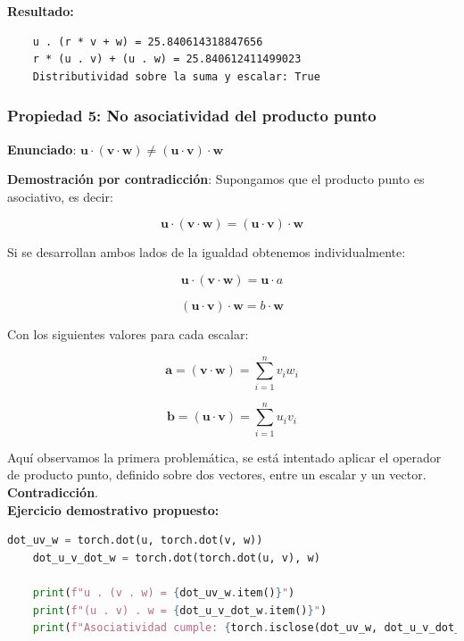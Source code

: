 \documentclass[12 pt]{article}
\begin{document}
\textbf{Resultado:}
\begin{lstlisting}
    u . (r * v + w) = 25.840614318847656
    r * (u . v) + (u . w) = 25.840612411499023
    Distributividad sobre la suma y escalar: True
\end{lstlisting}


\subsubsection*{Propiedad 5: No asociatividad del producto punto}

\begin{center}
\textbf{Enunciado}: \(\mathbf{u} \cdot (\mathbf{v} \cdot \mathbf{w}) \neq (\mathbf{u} \cdot \mathbf{v}) \cdot \mathbf{w}\)\\
\end{center}

\textbf{Demostración por contradicción}: Supongamos que el producto punto es asociativo, es decir:

\[
\mathbf{u} \cdot (\mathbf{v} \cdot \mathbf{w}) = (\mathbf{u} \cdot \mathbf{v}) \cdot \mathbf{w}
\]

Si se desarrollan ambos lados de la igualdad obtenemos individualmente:

\[
\mathbf{u} \cdot (\mathbf{v} \cdot \mathbf{w}) = \mathbf{u} \cdot a
\]

\[
(\mathbf{u} \cdot \mathbf{v}) \cdot \mathbf{w} = b \cdot \mathbf{w}
\]

Con los siguientes valores para cada escalar:

\[
\mathbf{a} = (\mathbf{v} \cdot \mathbf{w}) = \sum_{i=1}^{n} v_i w_i
\]

\[
\mathbf{b} = (\mathbf{u} \cdot \mathbf{v}) = \sum_{i=1}^{n} u_i v_i
\]

Aquí observamos la primera problemática, se está intentado aplicar el operador de producto punto, definido sobre dos vectores, entre un escalar y un vector. \textbf{Contradicción}.\\

\textbf{Ejercicio demostrativo propuesto:}
\begin{lstlisting}[language=Python]
    dot_uv_w = torch.dot(u, torch.dot(v, w))
    dot_u_v_dot_w = torch.dot(torch.dot(u, v), w)
    
    print(f"u . (v . w) = {dot_uv_w.item()}")
    print(f"(u . v) . w = {dot_u_v_dot_w.item()}")
    print(f"Asociatividad cumple: {torch.isclose(dot_uv_w, dot_u_v_dot_w)}")
\end{lstlisting}
\end{document}
